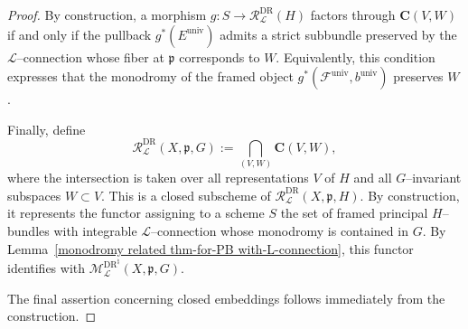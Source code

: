 \documentclass[10pt,a4paper]{amsart}
\begin{document}
\begin{proof}
	By construction, a morphism $g \colon S \to \mathcal{R}^{\text{DR}}_{\mathcal{L}}(H)$ factors
	through $\mathbf{C}(V,W)$ if and only if the pullback
	$g^{*}(E^{\mathrm{univ}})$ admits a strict subbundle preserved by the
	$\mathcal{L}$--connection whose fiber at $\mathfrak{p}$ corresponds to $W$.
	Equivalently, this condition expresses that the monodromy of the framed object
	$g^{*}(\mathcal{F}^{\mathrm{univ}}, b^{\mathrm{univ}})$ preserves $W$.
	
	Finally, define
	\[
	\mathcal{R}^{\text{DR}}_{\mathcal{L}}(X,\mathfrak{p},G)
	:=
	\bigcap_{(V,W)} \mathbf{C}(V,W),
	\]
	where the intersection is taken over all representations $V$ of $H$ and all $G$--invariant subspaces $W \subset V$.
	This is a closed subscheme of
	$\mathcal{R}^{\text{DR}}_{\mathcal{L}}(X,\mathfrak{p},H)$.
	By construction, it represents the functor assigning to a scheme $S$ the set of framed principal $H$--bundles with integrable $\mathcal{L}$--connection whose monodromy is contained in $G$.
	By Lemma~\eqref{monodromy related thm-for-PB with-L-connection}, this functor identifies with $\mathcal{M}^{\text{DR}^{\natural}}_{\mathcal{L}}(X,\mathfrak{p},G)$.
	
	The final assertion concerning closed embeddings follows immediately from the
	construction.
\end{proof}
\end{document}

